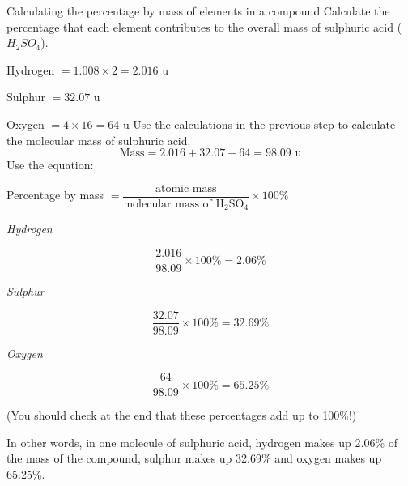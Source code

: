 \begin{wex}{Calculating the percentage by mass of elements in a compound}{
Calculate the percentage that each element contributes to the overall mass of sulphuric acid ($H_{2}SO_{4}$).}{

Hydrogen $= 1.008 \times 2 = 2.016$ u

Sulphur $= 32.07$ u

Oxygen $= 4 \times 16 = 64$ u
Use the calculations in the previous step to calculate the molecular mass of sulphuric acid.
\begin{equation*}
\text{Mass} = 2.016 + 32.07 + 64 = 98.09 \text{ u}
\end{equation*}
Use the equation:
\begin{center}
Percentage by mass $= \dfrac{\text{atomic mass}}{\text{molecular mass of H}_{2}\text{SO}_{4}} \times 100\%$
\end{center}

\textit{Hydrogen}

\begin{equation*}
\frac{2.016}{98.09} \times 100\% = 2.06\%
\end{equation*}

\textit{Sulphur}

\begin{equation*}
\frac{32.07}{98.09} \times 100\% = 32.69\%
\end{equation*}

\textit{Oxygen}

\begin{equation*}
\frac{64}{98.09} \times 100\% = 65.25\%
\end{equation*}


(You should check at the end that these percentages add up to 100\%!)

In other words, in one molecule of sulphuric acid, hydrogen makes up 2.06\% of the mass of the compound, sulphur makes up 32.69\% and oxygen makes up 65.25\%.
}
\end{wex}


